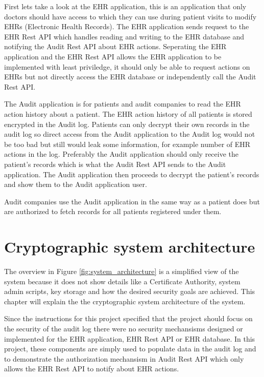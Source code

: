 \documentclass[11pt]{article}
\begin{document}
\begin{flushleft}
\newpage

First lets take a look at the EHR application, this is an application that only doctors should have access to which they can use during patient visits to modify EHRs (Electronic Health Records). The EHR application sends request to the EHR Rest API which handles reading and writing to the EHR database and notifying the Audit Rest API about EHR actions. Seperating the EHR application and the EHR Rest API allows the EHR application to be implemented with least priviledge, it should only be able to request actions on EHRs but not directly access the EHR database or independently call the Audit Rest API.

The Audit application is for patients and audit companies to read the EHR action history about a patient. The EHR action history of all patients is stored encrypted in the Audit log. Patients can only decrypt their own records in the audit log so direct access from the Audit application to the Audit log would not be too bad but still would leak some information, for example number of EHR actions in the log. Preferably the Audit application should only receive the patient's records which is what the Audit Rest API sends to the Audit application. The Audit application then proceeds to decrypt the patient's records and show them to the Audit application user.

Audit companies use the Audit application in the same way as a patient does but are authorized to fetch records for all patients registered under them.

\section{Cryptographic system architecture}

The overview in Figure \ref{fig:system_architecture} is a simplified view of the system because it does not show details like a Certificate Authority, system admin scripts, key storage and how the desired security goals are achieved. This chapter will explain the the cryptographic system architecture of the system.

Since the instructions for this project specified that the project should focus on the security of the audit log there were no security mechansisms designed or implemented for the EHR application, EHR Rest API or EHR database. In this project, these components are simply used to populate data in the audit log and to demonstrate the authorization mechansism in Audit Rest API which only allows the EHR Rest API to notify about EHR actions.


\end{flushleft}
\end{document}
